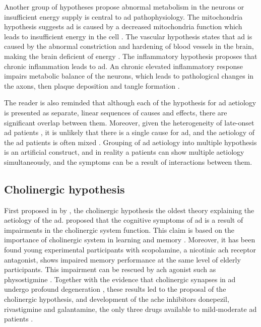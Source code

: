 Another group of hypotheses propose abnormal metabolism in the neurons or insufficient energy supply is central to \gls{ad} pathophysiology. The mitochondria hypothesis suggests \gls{ad} is caused by a decreased mitochondria function which leads to insufficient energy in the cell \citep{zhu06a, swerdlow14}. The vascular hypothesis states that \gls{ad} is caused by the abnormal constriction and hardening of blood vessels in the brain, making the brain deficient of energy \citep{luchsinger05, mamelak17}. The inflammatory hypothesis proposes that chronic inflammation leads to \gls{ad}. An chronic elevated inflammatory response impairs metabolic balance of the neurons, which leads to pathological changes in the axons, then plaque deposition and tangle formation \citep{krstic13}. 

The reader is also reminded that although each of the hypothesis for \gls{ad} aetiology is presented as separate, linear sequences of causes and effects, there are significant overlap between them. Moreover, given the heterogeneity of late-onset \gls{ad} patients \citep{komarova11, tschanz11}, it is unlikely that there is a single cause for \gls{ad}, and the aetiology of the \gls{ad} patients is often mixed \citep{schneider07}. Grouping of \gls{ad} aetiology into multiple hypothesis is an artificial construct, and in reality a patients can show multiple aetiology simultaneously, and the symptoms can be a result of interactions between them. 

\subsection{Cholinergic hypothesis\label{ach-hypo}}
First proposed in \citeyear{bartus82} by \citeauthor{bartus82}, the cholinergic hypothesis the oldest theory explaining the aetiology of the \gls{ad}. \citet{bartus82} proposed that the cognitive symptoms of \gls{ad} is a result of impairments in the cholinergic system function. This claim is based on  the importance of cholinergic system in learning and memory \citep{deutsch71}. Moreover, it has been found young experimental participants with scopolamine, a nicotinic \gls{ach} receptor antagonist, shows impaired memory performance at the same level of elderly participants. This impairment can be rescued by \gls{ach} agonist such as physostigmine \citep{drachman74}. Together with the evidence that cholinergic synapses in \gls{ad} undergo profound degeneration \citep{whitehouse82}, these results led to the proposal of the cholinergic hypothesis, and development of the \gls{ache} inhibitors donepezil, rivastigmine and galantamine, the only three drugs available to mild-moderate \gls{ad} patients \citep[][ also see Section \ref{treatment}]{bartus00}. 

